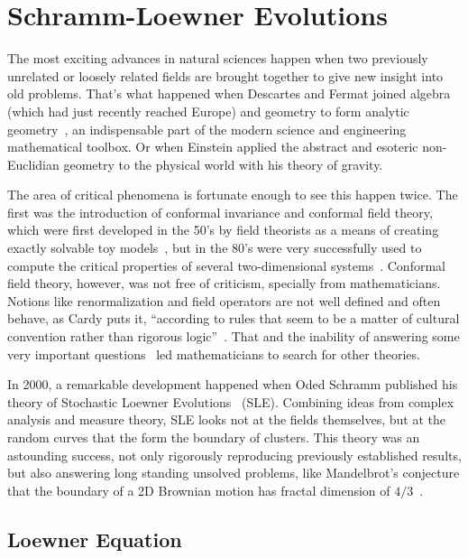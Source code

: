 \chapter{Schramm-Loewner Evolutions}
\label{ch:sle}

The most exciting advances in natural sciences happen when two previously
unrelated or loosely related fields are brought together to give new insight
into old problems. That's what happened when Descartes and Fermat joined
algebra (which had just recently reached Europe) and geometry to form analytic
geometry~\cite{Stillwell2010}, an indispensable part of the modern science and
engineering mathematical toolbox. Or when Einstein applied the abstract and
esoteric non-Euclidian geometry to the physical world with his theory of
gravity.

The area of critical phenomena is fortunate enough to see this happen twice.
The first was the introduction of conformal invariance and conformal field
theory, which were first developed in the 50's by field theorists as a means of
creating exactly solvable toy models~\cite{Thirring1958}, but in the 80's were
very successfully used to compute the critical properties of several
two-dimensional systems~\cite{Nahm2000}. Conformal field theory, however, was
not free of criticism, specially from mathematicians. Notions like
renormalization and field operators are not well defined and often behave, as
Cardy puts it, ``according to rules that seem to be a matter of cultural
convention rather than rigorous logic''~\cite{Cardy2005}. That and the
inability of answering some very important questions~\cite{Langlands1994} led
mathematicians to search for other theories.

In 2000, a remarkable development happened when Oded Schramm published his
theory of Stochastic Loewner Evolutions~\cite{Schramm2000} (SLE). Combining
ideas from complex analysis and measure theory, SLE looks not at the fields
themselves, but at the random curves that the form the boundary of clusters.
This theory was an astounding success, not only rigorously reproducing
previously established results, but also answering long standing unsolved
problems, like Mandelbrot's conjecture that the boundary of a 2D Brownian
motion has fractal dimension of $4/3$~\cite{Lawler2001}.


\section{Loewner Equation}
\label{sec:le}

